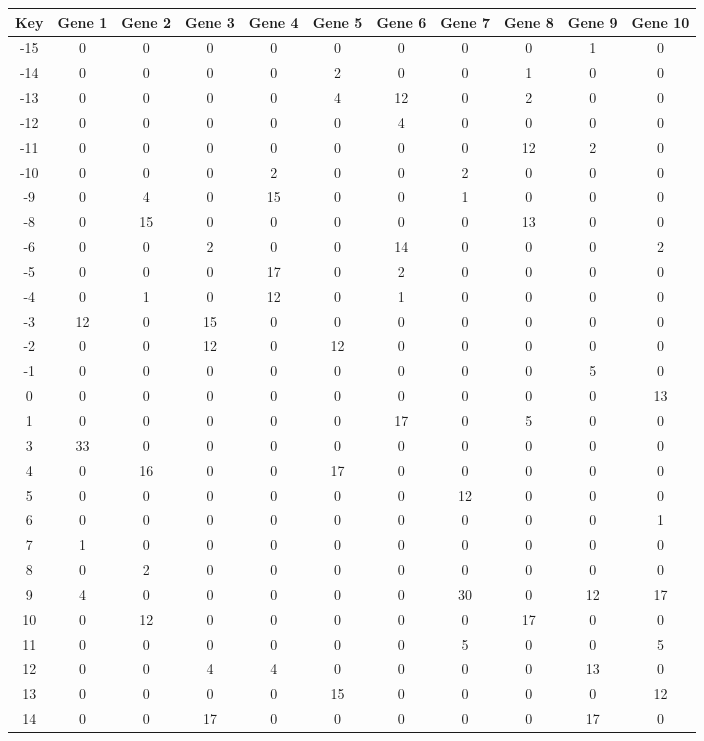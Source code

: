 \begin{tabular}{|c|c|c|c|c|c|c|c|c|c|c|}
\hline
Key & Gene 1 & Gene 2 & Gene 3 & Gene 4 & Gene 5 & Gene 6 & Gene 7 & Gene 8 & Gene 9 & Gene 10 \\
\hline
-15 & 0 & 0 & 0 & 0 & 0 & 0 & 0 & 0 & 1 & 0 \\
-14 & 0 & 0 & 0 & 0 & 2 & 0 & 0 & 1 & 0 & 0 \\
-13 & 0 & 0 & 0 & 0 & 4 & 12 & 0 & 2 & 0 & 0 \\
-12 & 0 & 0 & 0 & 0 & 0 & 4 & 0 & 0 & 0 & 0 \\
-11 & 0 & 0 & 0 & 0 & 0 & 0 & 0 & 12 & 2 & 0 \\
-10 & 0 & 0 & 0 & 2 & 0 & 0 & 2 & 0 & 0 & 0 \\
-9 & 0 & 4 & 0 & 15 & 0 & 0 & 1 & 0 & 0 & 0 \\
-8 & 0 & 15 & 0 & 0 & 0 & 0 & 0 & 13 & 0 & 0 \\
-6 & 0 & 0 & 2 & 0 & 0 & 14 & 0 & 0 & 0 & 2 \\
-5 & 0 & 0 & 0 & 17 & 0 & 2 & 0 & 0 & 0 & 0 \\
-4 & 0 & 1 & 0 & 12 & 0 & 1 & 0 & 0 & 0 & 0 \\
-3 & 12 & 0 & 15 & 0 & 0 & 0 & 0 & 0 & 0 & 0 \\
-2 & 0 & 0 & 12 & 0 & 12 & 0 & 0 & 0 & 0 & 0 \\
-1 & 0 & 0 & 0 & 0 & 0 & 0 & 0 & 0 & 5 & 0 \\
0 & 0 & 0 & 0 & 0 & 0 & 0 & 0 & 0 & 0 & 13 \\
1 & 0 & 0 & 0 & 0 & 0 & 17 & 0 & 5 & 0 & 0 \\
3 & 33 & 0 & 0 & 0 & 0 & 0 & 0 & 0 & 0 & 0 \\
4 & 0 & 16 & 0 & 0 & 17 & 0 & 0 & 0 & 0 & 0 \\
5 & 0 & 0 & 0 & 0 & 0 & 0 & 12 & 0 & 0 & 0 \\
6 & 0 & 0 & 0 & 0 & 0 & 0 & 0 & 0 & 0 & 1 \\
7 & 1 & 0 & 0 & 0 & 0 & 0 & 0 & 0 & 0 & 0 \\
8 & 0 & 2 & 0 & 0 & 0 & 0 & 0 & 0 & 0 & 0 \\
9 & 4 & 0 & 0 & 0 & 0 & 0 & 30 & 0 & 12 & 17 \\
10 & 0 & 12 & 0 & 0 & 0 & 0 & 0 & 17 & 0 & 0 \\
11 & 0 & 0 & 0 & 0 & 0 & 0 & 5 & 0 & 0 & 5 \\
12 & 0 & 0 & 4 & 4 & 0 & 0 & 0 & 0 & 13 & 0 \\
13 & 0 & 0 & 0 & 0 & 15 & 0 & 0 & 0 & 0 & 12 \\
14 & 0 & 0 & 17 & 0 & 0 & 0 & 0 & 0 & 17 & 0 \\
\hline
\end{tabular}